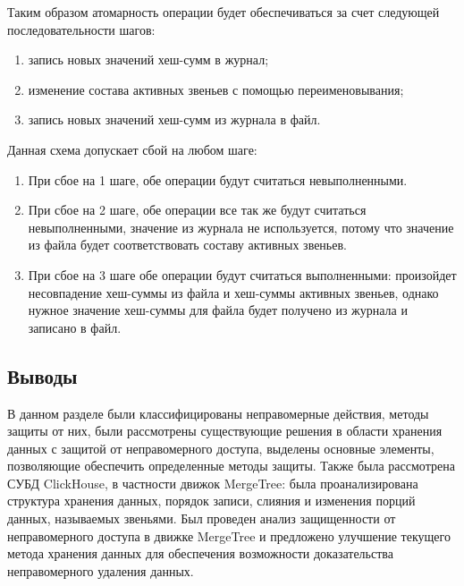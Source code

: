 Таким образом атомарность операции будет обеспечиваться за счет следующей последовательности шагов:
\begin{enumerate}
	\item запись новых значений хеш-сумм в журнал;
	\item изменение состава активных звеньев с помощью переименовывания;
	\item запись новых значений хеш-сумм из журнала в файл.
\end{enumerate}

Данная схема допускает сбой на любом шаге:
\begin{enumerate}
	\item При сбое на 1 шаге, обе операции будут считаться невыполненными.
	\item При сбое на 2 шаге, обе операции все так же будут считаться невыполненными, значение из журнала не используется, потому что значение из файла будет соответствовать составу активных звеньев.
	\item При сбое на 3 шаге обе операции будут считаться выполненными: произойдет несовпадение хеш-суммы из файла и хеш-суммы активных звеньев, однако нужное значение хеш-суммы для файла будет получено из журнала и записано в файл.
\end{enumerate}

\subsection{Выводы}

В данном разделе были классифицированы неправомерные действия, методы защиты от них, были рассмотрены существующие решения в области хранения данных с защитой от неправомерного доступа, выделены основные элементы, позволяющие обеспечить определенные методы защиты. Также была рассмотрена СУБД ClickHouse, в частности движок MergeTree: была проанализирована структура хранения данных, порядок записи, слияния и изменения порций данных, называемых звеньями. Был проведен анализ защищенности от неправомерного доступа в движке MergeTree и предложено улучшение текущего метода хранения данных для обеспечения возможности доказательства неправомерного удаления данных.

\pagebreak